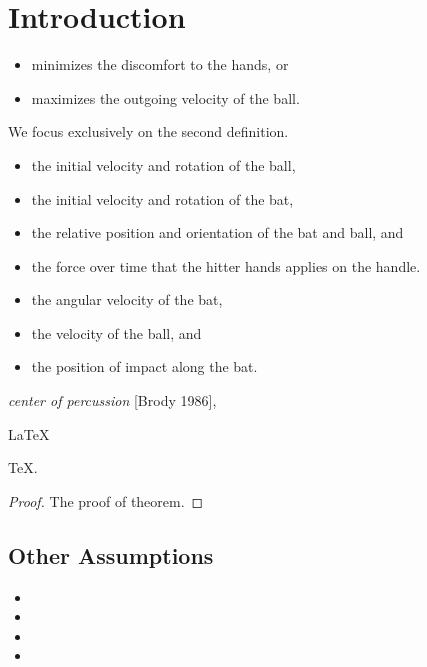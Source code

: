 \documentclass{mcmthesis}
\begin{document}
\section{Introduction}

\lipsum[2]
\begin{itemize}
\item minimizes the discomfort to the hands, or
\item maximizes the outgoing velocity of the ball.
\end{itemize}
We focus exclusively on the second definition.

\begin{itemize}
\item the initial velocity and rotation of the ball,
\item the initial velocity and rotation of the bat,
\item the relative position and orientation of the bat and ball, and
\item the force over time that the hitter hands applies on the handle.
\end{itemize}
\lipsum[3]
\begin{itemize}
\item the angular velocity of the bat,
\item the velocity of the ball, and
\item the position of impact along the bat.
\end{itemize}
\lipsum[4]
\emph{center of percussion} [Brody 1986], \lipsum[5]

\begin{Theorem} \label{thm:latex}
\LaTeX
\end{Theorem}
\begin{Lemma} \label{thm:tex}
\TeX .
\end{Lemma}
\begin{proof}
The proof of theorem.
\end{proof}

\subsection{Other Assumptions}
\lipsum[6]
\begin{itemize}
\item
\item
\item
\item
\end{itemize}

\lipsum[7]
\end{document}
